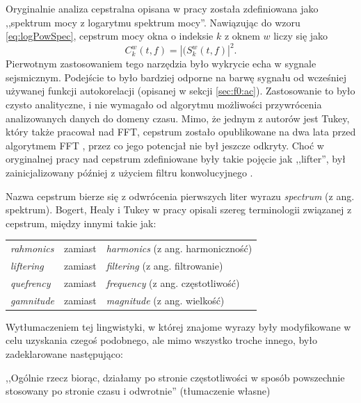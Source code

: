 \documentclass[12pt,a4paper,twoside]{mwart}
\begin{document}
Oryginalnie analiza cepstralna opisana w pracy \cite{Transcription:Bogert:FirstCepstrum} została zdefiniowana jako ,,spektrum mocy z logarytmu spektrum mocy''. Nawiązując do wzoru \ref{eq:logPowSpec}, cepstrum mocy okna o indeksie $k$ z oknem $w$ liczy się jako 
\begin{equation}\label{eq:ceps1}
  C_k^w(t, f) = |(S_k^w(t,f)|^2.
\end{equation}
Pierwotnym zastosowaniem tego narzędzia było wykrycie echa w sygnale sejsmicznym. Podejście to było bardziej odporne na barwę sygnału od wcześniej używanej funkcji autokorelacji (opisanej w sekcji \ref{sec:f0:ac}). Zastosowanie to było czysto analityczne, i nie wymagało od algorytmu możliwości przywrócenia analizowanych danych do domeny czasu. Mimo, że jednym z autorów \cite{Transcription:Bogert:FirstCepstrum} jest Tukey, który także pracował nad FFT, cepstrum zostało opublikowane na dwa lata przed algorytmem FFT \cite{Transcription:Tukey:FFT}, przez co jego potencjał nie był jeszcze odkryty. Choć w oryginalnej pracy nad cepstrum zdefiniowane były takie pojęcie jak ,,lifter'', był zainicjalizowany później z użyciem filtru konwolucyjnego \cite[1-2]{Transcription:Randall:CepstrumHistory}. 

Nazwa cepstrum bierze się z odwrócenia pierwszych liter wyrazu \textit{spectrum} (z ang. spektrum). Bogert, Healy i Tukey w pracy \cite{Transcription:Bogert:FirstCepstrum} opisali szereg terminologii związanej z cepstrum, między innymi takie jak:
\begin{table}[H]\centering
  \begin{tabular}{lll}
  \textit{rahmonics} & zamiast & \textit{harmonics} (z ang. harmoniczność) \\
  \textit{liftering} & zamiast & \textit{filtering} (z ang. filtrowanie) \\
  \textit{quefrency} & zamiast & \textit{frequency} (z ang. częstotliwość) \\
  \textit{gamnitude} & zamiast & \textit{magnitude} (z ang. wielkość)
  \end{tabular}
\end{table}
\noindent Wytłumaczeniem tej lingwistyki, w której znajome wyrazy były modyfikowane w celu uzyskania czegoś podobnego, ale mimo wszystko troche innego, było zadeklarowane następująco: 
\begin{displayquote}
,,Ogólnie rzecz biorąc, działamy po stronie częstotliwości w sposób powszechnie stosowany po stronie czasu i odwrotnie'' \cite[95]{Transcription:Oppenheim:FromFqToQf} (tłumaczenie własne)
\end{displayquote}
\end{document}
